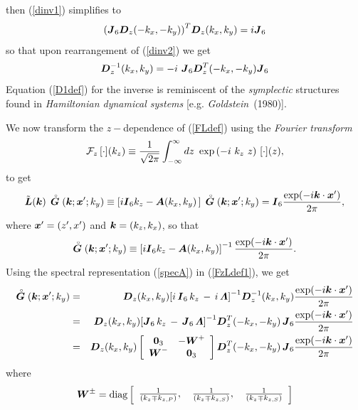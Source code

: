 \documentclass[11pt]{article}
\newcommand{\bmi}[1]{\mbox{\boldmath$\mit #1$\unboldmath}}
\newcommand{\rf}[1]{\stackrel{\scriptscriptstyle _{\,\,\circ}}{ #1}}
\begin{document}
 then (\ref{dinv1}) simplifies to
\begin{equation} \label{dinv2}
{\left({{\bmi  J}_{6}{\bmi  D}_{z}(-{k}_{x},-{k}_{y})}\right)}^{T}{\bmi  D}_{z}({k}_{x},{k}_{y})
=i {\bmi  J}_{6}
\end{equation}
so that upon rearrangement of (\ref{dinv2}) we get
\begin{equation}	\label{D1def}
{\bmi  D}_{z}^{-1}({k}_{x},{k}_{y})=-i\	{\bmi  J}_6{\bmi  D}_{z}^{T}(-{k}_{x},-{k}_{y}){\bmi  J}_6
\end{equation}
Equation (\ref{D1def}) for the inverse is reminiscent of the {\em
symplectic\/} structures found in {\em Hamiltonian dynamical systems\/}
[e.g. {\em Goldstein}~(1980)].


We now transform the $z-$dependence of  (\ref{FLdef}) using
the {\em  Fourier transform\/}
\[
{\cal F}_{z}\,
[\cdot] ({k}_{z}) \equiv \frac{1}{\sqrt{2 \pi}}\int_{-\infty }^{ \infty }
dz\ \exp \left({-i\ {k}_{z}\ z}\right)\, [\cdot] (z) ,\]
 to get
\begin{equation}	\label{FzLdef}
	\tilde{\bmi  L}({\bmi k}) \,\rf{\bmi  G}({\bmi k};{\bmi x}^{\prime};k_y) \equiv \left[i
{\bmi  I}_6 {k}_{z} -{\bmi
A}({k}_{x},{k}_{y})\,
	\right]\,\rf{\bmi  G}({\bmi k};{\bmi x}^{\prime};k_y)={\bmi  I}_{6}
	\frac{\exp({-i {\bmi k}\cdot {\bmi x}^{\prime}})}{{2 \pi}},
\end{equation}
where ${\bmi x}^{\prime}=(z^{\prime},x^{\prime})$ and  ${\bmi
k}=(k_{z},k_{x})$, so that
\begin{equation}	\label{FzLdef1}
	\rf{\bmi  G}({\bmi k};{\bmi x}^{\prime};k_y) \equiv
	\left[i {\bmi  I}_6 {k}_{z} -{\bmi  A}({k}_{x},{k}_{y}) \right]^{-1}
	\frac{\exp({-i {\bmi k}\cdot {\bmi x}^{\prime}})}{{2 \pi}}.
\end{equation}
Using the spectral representation (\ref{specA}) in  (\ref{FzLdef1}),
we get
\begin{eqnarray} \label{InvLDef0}
\rf{\bmi  G}({\bmi k};{\bmi x}^{\prime};k_y)
&=&{\bmi  D}_{z}({k}_{x},{k}_{y})
{\left[i\, {\bmi  I}_{6}\, {k}_{z}\, -\, i\,   {\bmi \Lambda} \right]}^{-1}
{\bmi  D}_{z}^{-1}({k}_{x},{k}_{y}) \frac{\exp({-i {\bmi k}\cdot {\bmi x}^{\prime}})}{2 \pi}
\nonumber\\
&=&{\bmi  D}_{z}({k}_{x},{k}_{y})
{\left[{\bmi  J}_{6}\, {k}_{z}\, - \,{\bmi  J}_{6}\, {\bmi \Lambda}
\right]}^{-1}
{\bmi  D}_{z}^{T}(-{k}_{x},-{k}_{y})\,{\bmi  J}_6
\frac{\exp(-i {\bmi k}\cdot {\bmi x}^{\prime})}{2 \pi}\nonumber\\
&=&{\bmi  D}_{z}({k}_{x},{k}_{y})
\left[{\begin{array}{cc}{\bf 0}_{3}&-{\bmi W}^{+}\\
{\bmi W}^{-}&{\bf 0}_{3}\end{array}}\right]
{\bmi
D}_{z}^{T}(-{k}_{x},-{k}_{y})
\,{\bmi  J}_6 \frac{\exp(-i {\bmi k}\cdot {\bmi x}^{\prime})}{{2 \pi}}
\end{eqnarray}
where
\[
{\bmi W}^{\pm}=\mbox{diag}
\left[\begin{array}{ccc}
\frac{1}{({k}_{z}\mp{k}_{z,P })},\,&\frac{1}{({k}_{z}\mp{k}_{z,S
})},\,&\frac{1}{({k}_{z}\mp{k}_{z,S })}\end{array}\right]
\]
\end{document}
